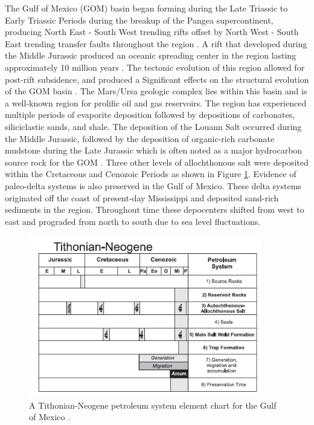 \documentclass[fleqn]{article}
\begin{document}
The Gulf of Mexico (GOM) basin began forming during the Late Triassic to Early Triassic Periods during the breakup of the Pangea supercontinent, producing North East - South West trending rifts offset by North West - South East trending transfer faults throughout the region \cite{Nixon}. A rift that developed during the Middle Jurassic produced an oceanic spreading center in the region lasting approximately 10 million years \cite{Bouroullec}. The tectonic evolution of this region allowed for post-rift subsidence, and produced a Significant effects on the structural evolution of the GOM basin \cite{Bouroullec}. The Mars/Ursa geologic complex lies within this basin and is a well-known region for prolific oil and gas reservoirs. The region has experienced multiple periods of evaporite deposition followed by depositions of carbonates, siliciclastic sands, and shale. The deposition of the Louann Salt occurred during the Middle Jurassic, followed by the deposition of organic-rich carbonate mudstone during the Late Jurassic which is often noted as a major hydrocarbon source rock for the GOM \cite{Nixon}. Three other levels of allochthonous salt were deposited within the Cretaceous and Cenozoic Periods as shown in Figure \ref{fig:PetroleumSystem}. Evidence of paleo-delta systems is also preserved in the Gulf of Mexico. These delta systems originated off the coast of present-day Mississippi and deposited sand-rich sediments in the region. Throughout time these depocenters shifted from west to east and prograded from north to south due to sea level fluctuations. 

\begin{figure}[H]
    \centering
    \includegraphics[width=4in]{Images/petroleum_system.png}
    \caption{A Tithonian-Neogene petroleum system element chart for the Gulf of Mexico \cite{Bouroullec}. }
    \label{fig:PetroleumSystem}
\end{figure}
\end{document}

